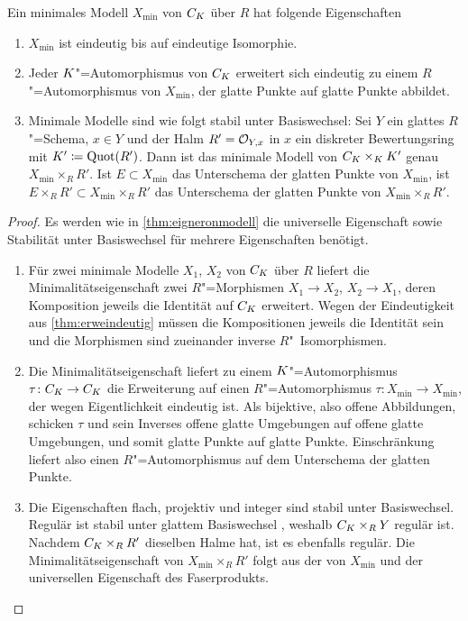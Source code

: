 \begin{Satz}\label{thm:eigminmodell}
  Ein minimales Modell $X_{\text{min}}$ von $C_{K}$ über $R$ hat
  folgende Eigenschaften
  \begin{enumerate}[label=(\alph*)]
  \item $X_{\text{min}}$ ist eindeutig bis auf eindeutige Isomorphie.
  \item{}
    Jeder $K$"=Automorphismus von $C_{K}$ erweitert sich eindeutig zu
    einem $R$"=Automorphismus von $X_{\text{min}}$, der glatte Punkte
    auf glatte Punkte abbildet.
  \item{}
    Minimale Modelle sind wie folgt stabil unter Basiswechsel:
    Sei $Y$ ein glattes $R$"=Schema, ${x\in Y}$ und der Halm
    ${R'=\mathcal{O}_{Y,x}}$ in $x$  ein diskreter Bewertungsring mit
    ${K'\coloneqq\operatorname{Quot}(R')}$.
    Dann ist das minimale Modell von $C_{K}\times_{K}K'$ genau
    $X_{\text{min}}\times_R R'$.
    Ist $E\subset X_{\text{min}}$ das Unterschema der glatten Punkte
    von $X_{\text{min}}$, ist
    $E\times_R R'\subset X_{\text{min}}\times_R R'$ das Unterschema
    der glatten Punkte von $X_{\text{min}}\times_R R'$.
  \end{enumerate}
  \begin{proof}
    Es werden wie in \ref{thm:eigneronmodell} die universelle
    Eigenschaft sowie Stabilität unter Basiswechsel für mehrere
    Eigenschaften benötigt.
    \begin{enumerate}[resume*,start=1]
    \item Für zwei minimale Modelle $X_1$, $X_2$ von $C_{K}$ über $R$
      liefert die Minimalitätseigenschaft zwei $R$"=Morphismen
      $X_1\to X_2$, $X_2\to X_1$, deren Komposition jeweils die
      Identität auf $C_{K}$ erweitert. Wegen der Eindeutigkeit aus
      \ref{thm:erweindeutig} müssen die Kompositionen jeweils die
      Identität sein und die Morphismen sind zueinander inverse
      $R$"~Iso\-mor\-phis\-men.
    \item Die Minimalitätseigenschaft liefert zu einem
      $K$"=Automorphismus $\tau\colon C_{K}\to C_{K}$ die Erweiterung auf
      einen $R$"=Automorphismus
      $\tau\colon X_{\text{min}}\to X_{\text{min}}$, der wegen
      Eigentlichkeit eindeutig ist.
      Als bijektive, also offene Abbildungen, schicken $\tau$ und
      sein Inverses offene glatte Umgebungen auf offene glatte
      Umgebungen, und somit glatte Punkte auf glatte
      Punkte. Einschränkung liefert also einen $R$"=Automorphismus auf
      dem Unterschema der glatten Punkte.
    \item Die Eigenschaften flach, projektiv und integer sind stabil
      unter Basiswechsel. Regulär ist stabil unter glattem
      Basiswechsel \cite[Chapter~2.3, S.\,49]{neron}, weshalb
      $C_{K}\times_R Y$ regulär ist.
      Nachdem $C_{K}\times_R R'$ dieselben Halme hat, ist es ebenfalls
      regulär.
      Die Minimalitätseigenschaft von ${X_{\text{min}}\times_R R'}$
      folgt aus der von $X_{\text{min}}$ und der universellen
      Eigenschaft des Faserprodukts.
      

\end{enumerate}
\end{proof}
\end{Satz}
